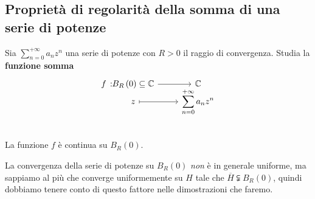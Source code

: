 \subsection{Proprietà di regolarità della somma di una serie di potenze}
Sia $\displaystyle\sum_{n=0}^{+\infty}a_nz^n$ una serie di potenze con $R>0$ il raggio di convergenza. Studia la \textbf{funzione somma}
\begin{equation}
	\funztot{f}{B_R\left(0\right)\subseteq\complexset}{\complexset}{z}{\displaystyle\sum_{n=0}^{+\infty}a_nz^n}
\end{equation}
\begin{proposition}~{}\\
	La funzione $f$ è continua su $B_R\left(0\right)$.
\end{proposition}
\begin{attention}
	La convergenza della serie di potenze su $B_R\left(0\right)$ \textit{non} è in generale uniforme, ma sappiamo al più che converge uniformemente su $H$ tale che $\overline{H}\subsetneqq B_R\left(0\right)$, quindi dobbiamo tenere conto di questo fattore nelle dimostrazioni che faremo.
\end{attention}
